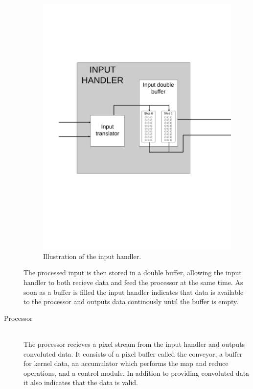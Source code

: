 \begin{Description}
\begin{description}
\begin{figure}[h!]
    \includegraphics[width=\linewidth]{img/input_handler.png}
    \caption{Illustration of the input handler.}
    \label{fig:Convolution}
\end{figure}

        The processed input is then stored in a double buffer, allowing the input handler to both recieve data and feed the processor at the same time.
        As soon as a buffer is filled the input handler indicates that data is available to the processor and outputs data continously until the buffer is empty.
    \item[Processor] \hfill\\
        The processor recieves a pixel stream from the input handler and outputs convoluted data. It consists of a pixel buffer called the conveyor, a buffer for kernel data, an accumulator which performs the map and reduce operations, and a control module. In addition to providing convoluted data it also indicates that the data is valid.


\end{description}
\end{Description}
